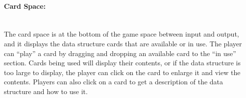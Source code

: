\paragraph{Card Space:} ~\\
The card space is at the bottom of the game space between input and output, and it displays the data structure cards that are available or in use.
The player can ``play'' a card by dragging and dropping an available card to the ``in use'' section.
Cards being used will display their contents, or if the data structure is too large to display, the player can click on the card to enlarge it and view the contents.
Players can also click on a card to get a description of the data structure and how to use it.



\newpage

